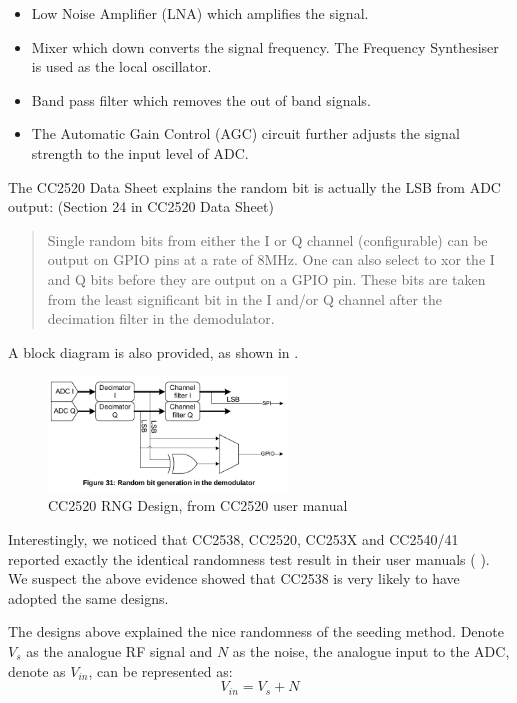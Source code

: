 \begin{itemize}
	\item Low Noise Amplifier (LNA) which amplifies the signal.
	\item Mixer which down converts the signal frequency. The Frequency Synthesiser is used as the local oscillator.
	\item Band pass filter which removes the out of band signals.
	\item The Automatic Gain Control (AGC) circuit further adjusts the signal strength to the input level of ADC.
\end{itemize}

The CC2520 Data Sheet\cite{CC2520Manual} explains the random bit is actually the LSB from ADC output: (Section 24 in CC2520 Data Sheet\cite{CC2520Manual})
\begin{quote}
Single random bits from either the I or Q channel (configurable) can be output on GPIO pins at a rate of 8MHz. One can also select to xor the I and Q bits before they are output on a GPIO pin. These bits are taken from the least significant bit in the I and/or Q channel after the decimation filter in the demodulator.
\end{quote}

A block diagram is also provided, as shown in .
\begin{figure}[!t]
\centering
\includegraphics[width=2.5in]{fig/CC2520_RNG.png}
\caption{CC2520 RNG Design, from CC2520 user manual\cite{CC2520Manual}}
\label{CC2520RFRND}
\end{figure}

Interestingly, we noticed that CC2538, CC2520, CC253X and CC2540/41 reported exactly the identical randomness test result in their user manuals (\cite{CC2538Manual} \cite{ CC2520Manual} \cite{CC2530Manual}). We suspect the above evidence showed that CC2538 is very likely to have adopted the same designs.

The designs above explained the nice randomness of the seeding method. Denote $V_s$ as the analogue RF signal and $N$ as the noise, the analogue input to the ADC, denote as  $V_{in}$, can be represented as:
\begin{equation} \label{V_in}
V_{in} = V_s + N
\end{equation}

